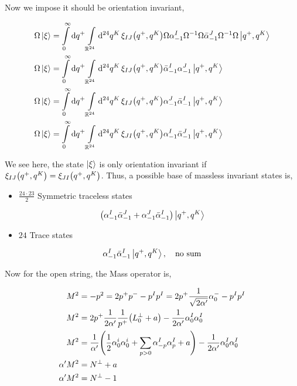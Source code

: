 Now we impose it should be orientation invariant,

\begin{align*}
    \Omega\ket{\xi}&=\int\limits_0^\infty\dd{q^+}\int\limits_{\mathbb R^{24}}\dd[24]{q^K}\xi_{IJ}\qty(q^+,q^K)\Omega\alpha^I_{-1}\Omega^{-1}\Omega{\bar\alpha}^J_{-1}\Omega^{-1}\Omega\ket{q^+,q^K}\\
    \Omega\ket{\xi}&=\int\limits_0^\infty\dd{q^+}\int\limits_{\mathbb R^{24}}\dd[24]{q^K}\xi_{IJ}\qty(q^+,q^K){\bar\alpha}^I_{-1}{\alpha}^J_{-1}\ket{q^+,q^K}\\
    \Omega\ket{\xi}&=\int\limits_0^\infty\dd{q^+}\int\limits_{\mathbb R^{24}}\dd[24]{q^K}\xi_{IJ}\qty(q^+,q^K){\alpha}^J_{-1}{\bar\alpha}^I_{-1}\ket{q^+,q^K}\\
    \Omega\ket{\xi}&=\int\limits_0^\infty\dd{q^+}\int\limits_{\mathbb R^{24}}\dd[24]{q^K}\xi_{JI}\qty(q^+,q^K){\alpha}^I_{-1}{\bar\alpha}^J_{-1}\ket{q^+,q^K}
\end{align*}

We see here, the state $\ket\xi$ is only orientation invariant if $\xi_{IJ}\qty(q^+,q^K)=\xi_{JI}\qty(q^+,q^K)$. Thus, a possible base of massless invariant states is,

\begin{itemize}
    \item $\frac{24\cdot 23}{2}$ Symmetric traceless states
\end{itemize}
\begin{align*}
    \qty(\alpha^I_{-1}{\bar\alpha}^J_{-1}+\alpha^J_{-1}{\bar\alpha}^I_{-1})\ket{q^+,q^K}
\end{align*}

\begin{itemize}
    \item $24$ Trace states
\end{itemize}
\begin{align*}
    \alpha^I_{-1}{\bar\alpha}^I_{-1}\ket{q^+,q^K},\ \ \ \textnormal{no sum}
\end{align*}

\probitem{}

Now for the open string, the Mass operator is,

\begin{align*}
    M^2&=-p^2=2p^+p^--p^Ip^I=2p^+\frac{1}{\sqrt{2\alpha'}}\alpha_0^--p^Ip^I\\
    M^2&=2p^+\frac{1}{2\alpha'}\frac{1}{p^+}\qty(L^\perp_0+a)-\frac{1}{2\alpha'}\alpha_0^I\alpha_0^I\\
    M^2&=\frac{1}{\alpha'}\qty(\frac12\alpha_0^i\alpha_0^i+\sum\limits_{p> 0}\alpha^I_{-p}\alpha^I_{p}+a)-\frac{1}{2\alpha'}\alpha_0^I\alpha_0^I\\
    \alpha'M^2&=N^\perp+a\\
    \alpha'M^2&=N^\perp-1
\end{align*}

